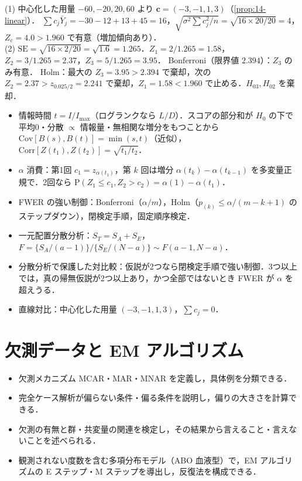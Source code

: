 \documentclass[a4paper,11pt,openany]{ltjsbook}
\newenvironment{kaitou}[1]{%
  \par\medskip\noindent
  \begin{tcolorbox}[enhanced,breakable,colback=bkgray!3,colframe=bkgray!60,boxrule=0.4pt,
    left=4pt,right=4pt,top=2pt,bottom=2pt,arc=1pt,
    title={\cref{#1}の解答},fonttitle=\bfseries\small,coltitle=white,colbacktitle=bkgray!80]}%
  {\end{tcolorbox}\par}
\newcommand{\Cov}{\mathrm{Cov}}
\newcommand{\Corr}{\mathrm{Corr}}
\newcommand{\Prob}{\mathrm{P}}
\newcommand{\SE}{\mathrm{SE}}
\begin{document}
\begin{kaitou}{reidai:14-3}
(1) 中心化した用量 $-60,-20,20,60$ より $\bm c=(-3,-1,1,3)$（\cref{prop:14-linear}）．
$\sum c_j\bar Y_j=-30-12+13+45=16$，$\sqrt{\sigma^2\sum c_j^2/n}=\sqrt{16\times20/20}=4$，$Z_c=4.0>1.960$ で有意（増加傾向あり）．\\
(2) $\SE=\sqrt{16\times2/20}=\sqrt{1.6}=1.265$．$Z_1=2/1.265=1.58$，$Z_2=3/1.265=2.37$，$Z_3=5/1.265=3.95$．
Bonferroni（限界値 $2.394$）：$Z_3$ のみ有意．
Holm：最大の $Z_3=3.95>2.394$ で棄却，次の $Z_2=2.37>z_{0.025/2}=2.241$ で棄却，$Z_1=1.58<1.960$ で止める．$H_{03},H_{02}$ を棄却．
\end{kaitou}

\begin{summarybox}
\begin{itemize}
\item 情報時間 $t=I/I_{\max}$（ログランクなら $L/D$）．スコアの部分和が $H_0$ の下で平均0・分散 $\propto$ 情報量・無相関な増分をもつことから $\Cov[B(s),B(t)]=\min(s,t)$（近似），$\Corr[Z(t_1),Z(t_2)]=\sqrt{t_1/t_2}$．
\item $\alpha$ 消費：第1回 $c_1=z_{\alpha(t_1)}$，第 $k$ 回は増分 $\alpha(t_k)-\alpha(t_{k-1})$ を多変量正規で．2回なら $\Prob(Z_1\le c_1,Z_2>c_2)=\alpha(1)-\alpha(t_1)$．
\item FWER の強い制御：Bonferroni（$\alpha/m$），Holm（$p_{(k)}\le\alpha/(m-k+1)$ のステップダウン），閉検定手順，固定順序検定．
\item 一元配置分散分析：$S_T=S_A+S_E$，$F=\{S_A/(a-1)\}/\{S_E/(N-a)\}\sim F(a-1,N-a)$．
\item 分散分析で保護した対比較：仮説が2つなら閉検定手順で強い制御．3つ以上では，真の帰無仮説が2つ以上あり，かつ全部ではないとき FWER が $\alpha$ を超えうる．
\item 直線対比：中心化した用量 $(-3,-1,1,3)$，$\sum c_j=0$．
\end{itemize}
\end{summarybox}

\chapter{欠測データと EM アルゴリズム}\label{ch:16}

\begin{goalbox}
\begin{itemize}
\item 欠測メカニズム MCAR・MAR・MNAR を定義し，具体例を分類できる．
\item 完全ケース解析が偏らない条件・偏る条件を説明し，偏りの大きさを計算できる．
\item 欠測の有無と群・共変量の関連を検定し，その結果から言えること・言えないことを述べられる．
\item 観測されない度数を含む多項分布モデル（ABO 血液型）で，EM アルゴリズムの E ステップ・M ステップを導出し，反復法を構成できる．
\end{itemize}
\end{goalbox}
\end{document}
